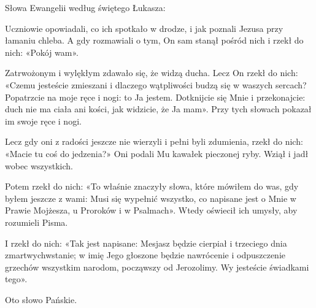 \indent{} Słowa Ewangelii według świętego Łukasza:

Uczniowie opowiadali, co ich spotkało w drodze, i jak poznali Jezusa przy łamaniu chleba. A gdy rozmawiali o tym, On sam stanął pośród nich i rzekł do nich: «Pokój wam».

Zatrwożonym i wylękłym zdawało się, że widzą ducha. Lecz On rzekł do nich: «Czemu jesteście zmieszani i dlaczego wątpliwości budzą się w waszych sercach? Popatrzcie na moje ręce i nogi: to Ja jestem. Dotknijcie się Mnie i przekonajcie: duch nie ma ciała ani kości, jak widzicie, że Ja mam». Przy tych słowach pokazał im swoje ręce i nogi.

Lecz gdy oni z radości jeszcze nie wierzyli i pełni byli zdumienia, rzekł do nich: «Macie tu coś do jedzenia?» Oni podali Mu kawałek pieczonej ryby. Wziął i jadł wobec wszystkich.

Potem rzekł do nich: «To właśnie znaczyły słowa, które mówiłem do was, gdy byłem jeszcze z wami: Musi się wypełnić wszystko, co napisane jest o Mnie w Prawie Mojżesza, u Proroków i w Psalmach». Wtedy oświecił ich umysły, aby rozumieli Pisma.

I rzekł do nich: «Tak jest napisane: Mesjasz będzie cierpiał i trzeciego dnia zmartwychwstanie; w imię Jego głoszone będzie nawrócenie i odpuszczenie grzechów wszystkim narodom, począwszy od Jerozolimy. Wy jesteście świadkami tego».

Oto słowo Pańskie.

